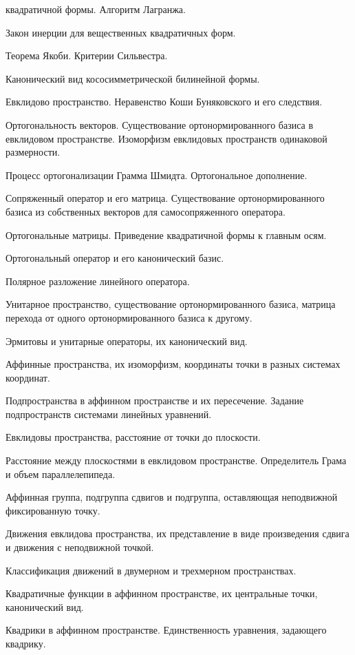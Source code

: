 \documentclass[a4paper]{article}
\begin{document}
\begin{nums}{-2}
квадратичной формы. Алгоритм Лагранжа.
\item Закон инерции для вещественных квадратичных форм.
\item Теорема Якоби. Критерии Сильвестра.
\item Канонический вид кососимметрической билинейной формы.
\item Евклидово пространство. Неравенство Коши Буняковского и его следствия.
\item Ортогональность векторов. Существование ортонормированного базиса в
евклидовом пространстве. Изоморфизм евклидовых пространств одинаковой
размерности.
\item Процесс ортогонализации Грамма Шмидта. Ортогональное дополнение.
\item Сопряженный оператор и его матрица. Существование ортонормированного
базиса из собственных векторов для самосопряженного оператора.
\item Ортогональные матрицы. Приведение квадратичной формы к главным осям.
\item Ортогональный оператор и его канонический базис.
\item Полярное разложение линейного оператора.
\item Унитарное пространство, существование ортонормированного базиса, матрица
перехода от одного ортонормированного базиса к другому.
\item Эрмитовы и унитарные операторы, их канонический вид.
\item Аффинные пространства, их изоморфизм, координаты точки в разных системах
координат.
\item Подпространства в аффинном пространстве и их пересечение. Задание
подпространств системами линейных уравнений.
\item Евклидовы пространства, расстояние от точки до плоскости.
\item Расстояние между плоскостями в евклидовом пространстве. Определитель
Грама и объем параллелепипеда.
\item Аффинная группа, подгруппа сдвигов и подгруппа, оставляющая неподвижной
фиксированную точку.
\item Движения евклидова пространства, их представление в виде произведения
сдвига и движения с неподвижной точкой.
\item Классификация движений в двумерном и трехмерном пространствах.
\item Квадратичные функции в аффинном пространстве, их центральные точки,
канонический вид.
\item Квадрики в аффинном пространстве. Единственность уравнения, задающего квадрику.

\end{nums}
\end{document}
